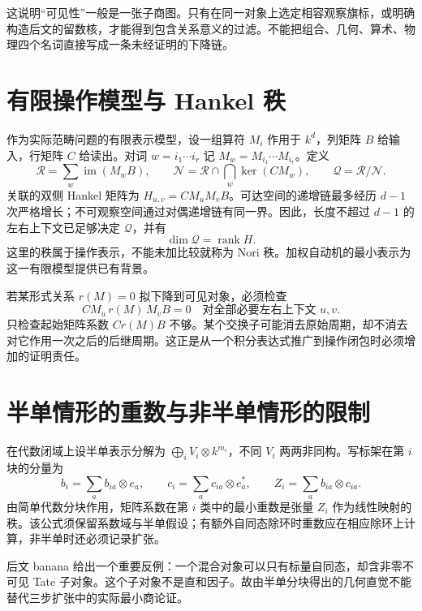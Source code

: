 \documentclass[11pt,a4paper,oneside]{ctexrep}
\theoremstyle{cnplain}
\theoremstyle{definition}
\theoremstyle{remark}
\newcommand{\rank}{\operatorname{rank}}
\newcommand{\im}{\operatorname{im}}
\begin{document}
这说明``可见性''一般是一张子商图。只有在同一对象上选定相容观察旗标，或明确构造后文的留数核，才能得到包含关系意义的过滤。不能把组合、几何、算术、物理四个名词直接写成一条未经证明的下降链。

\section{有限操作模型与 Hankel 秩}
作为实际范畴问题的有限表示模型，设一组算符 $M_i$ 作用于 $k^d$，列矩阵 $B$ 给输入，行矩阵 $C$ 给读出。对词 $w=i_1\cdots i_r$ 记 $M_w=M_{i_1}\cdots M_{i_r}$。定义
\begin{equation}
 \mathcal R=\sum_w\im(M_wB),\qquad
 \mathcal N=\mathcal R\cap\bigcap_w\ker(CM_w),\qquad
 \mathcal Q=\mathcal R/\mathcal N.
\end{equation}
关联的双侧 Hankel 矩阵为 $H_{u,v}=CM_uM_vB$。可达空间的递增链最多经历 $d-1$ 次严格增长；不可观察空间通过对偶递增链有同一界。因此，长度不超过 $d-1$ 的左右上下文已足够决定 $\mathcal Q$，并有
\begin{equation}\label{eq:hankel}
 \dim\mathcal Q=\rank H.
\end{equation}
这里的秩属于操作表示，不能未加比较就称为 Nori 秩。加权自动机的最小表示为这一有限模型提供已有背景\cite{kiefer}。

若某形式关系 $r(M)=0$ 拟下降到可见对象，必须检查
\begin{equation}
 CM_u\,r(M)\,M_vB=0
 \quad\text{对全部必要左右上下文 }u,v.
\end{equation}
只检查起始矩阵系数 $Cr(M)B$ 不够。某个交换子可能消去原始周期，却不消去对它作用一次之后的后继周期。这正是从一个积分表达式推广到操作闭包时必须增加的证明责任。

\section{半单情形的重数与非半单情形的限制}
在代数闭域上设半单表示分解为 $\bigoplus_i V_i\otimes k^{m_i}$，不同 $V_i$ 两两非同构。写标架在第 $i$ 块的分量为
\begin{equation}
 b_i=\sum_a b_{ia}\otimes e_a,\qquad
 c_i=\sum_a c_{ia}\otimes e_a^*,\qquad
 Z_i=\sum_a b_{ia}\otimes c_{ia}.
\end{equation}
由简单代数分块作用，矩阵系数在第 $i$ 类中的最小重数是张量 $Z_i$ 作为线性映射的秩。该公式须保留系数域与半单假设；有额外自同态除环时重数应在相应除环上计算，非半单时还必须记录扩张。

后文 banana 给出一个重要反例：一个混合对象可以只有标量自同态，却含非零不可见 Tate 子对象。这个子对象不是直和因子。故由半单分块得出的几何直觉不能替代三步扩张中的实际最小商论证。
\end{document}
